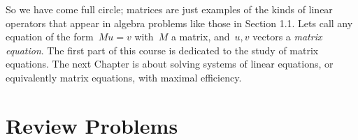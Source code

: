 
So we have come full circle; matrices are just examples of the kinds of linear operators that appear in algebra problems like those in 
Section 1.1. 
Lets call any equation of the form~$Mu=v$ with~$M$ a matrix, and~$u,v$ vectors a {\itshape matrix equation}. The first part of this course is dedicated to the study of matrix equations. 
The next Chapter is about solving systems of linear equations, or equivalently matrix equations, with maximal efficiency.

%
%








\section{Review Problems}


\newpage
